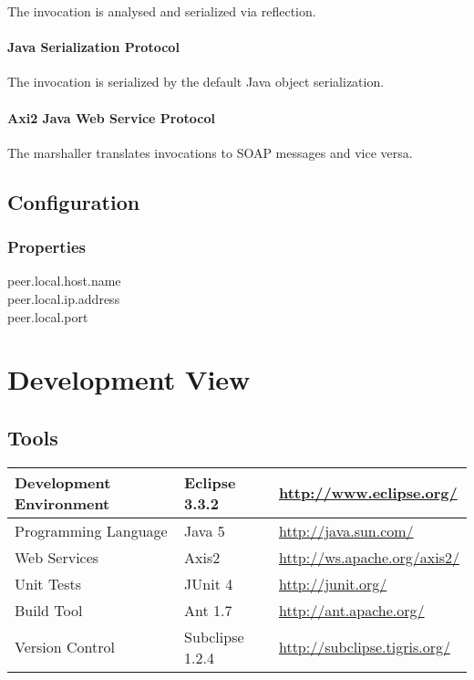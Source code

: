 \documentclass[a4paper]{article}
\begin{document}
The invocation is analysed and serialized via reflection.

\paragraph{Java Serialization Protocol}

The invocation is serialized by the default Java object serialization.

\paragraph{Axi2 Java Web Service Protocol}

The marshaller translates invocations to SOAP messages and vice versa.

\subsection{Configuration}

\subsubsection{Properties}

peer.local.host.name\\
peer.local.ip.address\\
peer.local.port\\

\section{Development View}

\subsection{Tools}

	\begin{tabular}{|l|l|l|}
	\hline
	Development Environment & Eclipse 3.3.2 & \url{http://www.eclipse.org/}\\
	\hline
	Programming Language & Java 5 & \url{http://java.sun.com/}\\
	\hline
	Web Services & Axis2 & \url{http://ws.apache.org/axis2/}\\
	\hline
	Unit Tests & JUnit 4 & \url{http://junit.org/}\\
	\hline
	Build Tool & Ant 1.7 & \url{http://ant.apache.org/}\\
	\hline
	Version Control & Subclipse 1.2.4 & \url{http://subclipse.tigris.org/}\\
	\hline
	\end{tabular}
\end{document}
